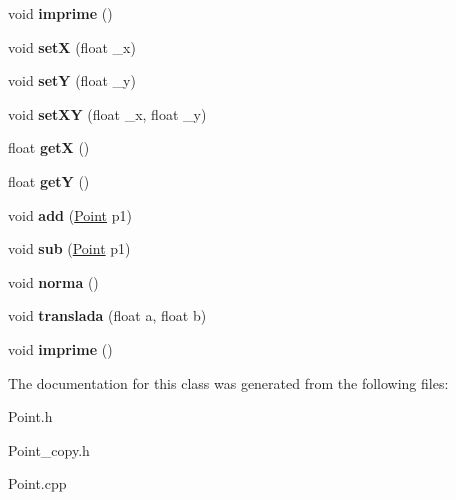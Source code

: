 \begin{DoxyCompactItemize}
\item 
\mbox{\label{classPoint_a1fb5c2501c27ab2cbc99d06c2a26a741}} 
void {\bfseries imprime} ()
\item 
\mbox{\label{classPoint_a428a1676e2fdec6753c42011a1d59d18}} 
void {\bfseries setX} (float \+\_\+x)
\item 
\mbox{\label{classPoint_a9868c4601b0ea0c2d0de20fe41ee0e49}} 
void {\bfseries setY} (float \+\_\+y)
\item 
\mbox{\label{classPoint_ab5385c6d9bfa841e641e4709fc9f14cc}} 
void {\bfseries set\+XY} (float \+\_\+x, float \+\_\+y)
\item 
\mbox{\label{classPoint_acc27466778cc87a662bba40268c4c0c8}} 
float {\bfseries getX} ()
\item 
\mbox{\label{classPoint_a3cccbca94719ddde353cce86ce0e2f64}} 
float {\bfseries getY} ()
\item 
\mbox{\label{classPoint_a6bcf8fd2524ecc4d5b6c1dc942d541a5}} 
void {\bfseries add} (\hyperlink{classPoint}{Point} p1)
\item 
\mbox{\label{classPoint_af7d9e533f0030edf4ab28fdc0f12acd4}} 
void {\bfseries sub} (\hyperlink{classPoint}{Point} p1)
\item 
\mbox{\label{classPoint_a6233714649b03294a020827fb53eb8ad}} 
void {\bfseries norma} ()
\item 
\mbox{\label{classPoint_ad9676e36f3444534b609e3c68422239a}} 
void {\bfseries translada} (float a, float b)
\item 
\mbox{\label{classPoint_a1fb5c2501c27ab2cbc99d06c2a26a741}} 
void {\bfseries imprime} ()
\end{DoxyCompactItemize}


The documentation for this class was generated from the following files\+:\begin{DoxyCompactItemize}
\item 
Point.\+h\item 
Point\+\_\+copy.\+h\item 
Point.\+cpp\end{DoxyCompactItemize}
